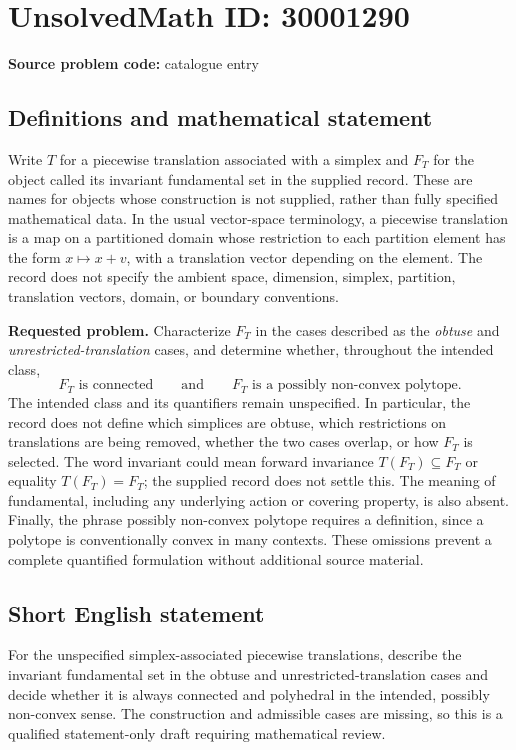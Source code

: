 \documentclass[11pt]{article}
\begin{document}
\section*{UnsolvedMath ID: 30001290}
\textbf{Source problem code:} catalogue entry
\subsection{Definitions and mathematical statement}
Write \(T\) for a piecewise translation associated with a simplex and \(F_T\) for the object called its invariant fundamental set in the supplied record. These are names for objects whose construction is not supplied, rather than fully specified mathematical data. In the usual vector-space terminology, a piecewise translation is a map on a partitioned domain whose restriction to each partition element has the form \(x\mapsto x+v\), with a translation vector depending on the element. The record does not specify the ambient space, dimension, simplex, partition, translation vectors, domain, or boundary conventions.

\textbf{Requested problem.} Characterize \(F_T\) in the cases described as the \emph{obtuse} and \emph{unrestricted-translation} cases, and determine whether, throughout the intended class,
\[
F_T\text{ is connected}
\qquad\text{and}\qquad
F_T\text{ is a possibly non-convex polytope}.
\]
The intended class and its quantifiers remain unspecified. In particular, the record does not define which simplices are obtuse, which restrictions on translations are being removed, whether the two cases overlap, or how \(F_T\) is selected. The word invariant could mean forward invariance \(T(F_T)\subseteq F_T\) or equality \(T(F_T)=F_T\); the supplied record does not settle this. The meaning of fundamental, including any underlying action or covering property, is also absent. Finally, the phrase possibly non-convex polytope requires a definition, since a polytope is conventionally convex in many contexts. These omissions prevent a complete quantified formulation without additional source material.
\subsection{Short English statement}
For the unspecified simplex-associated piecewise translations, describe the invariant fundamental set in the obtuse and unrestricted-translation cases and decide whether it is always connected and polyhedral in the intended, possibly non-convex sense. The construction and admissible cases are missing, so this is a qualified statement-only draft requiring mathematical review.
\end{document}
